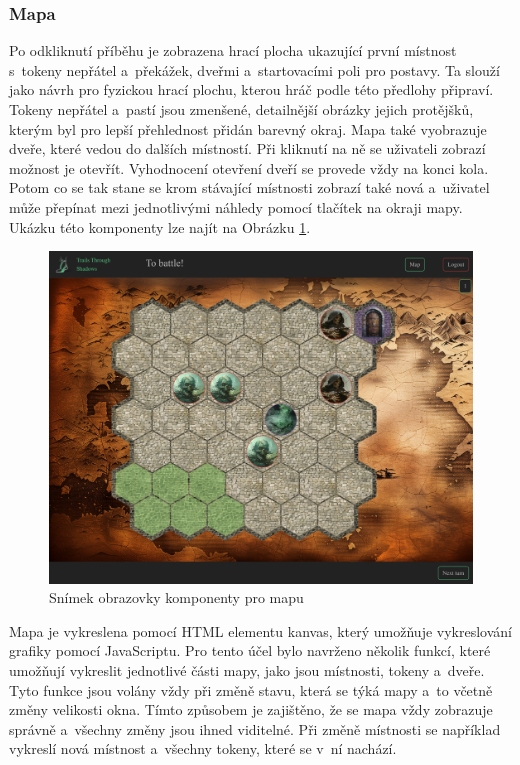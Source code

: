 \subsubsection*{Mapa}
Po odkliknutí příběhu je zobrazena hrací plocha ukazující první místnost s~tokeny nepřátel a~překážek, dveřmi a~startovacími poli pro postavy. Ta slouží jako návrh pro fyzickou hrací plochu, kterou hráč podle této předlohy připraví. Tokeny nepřátel a~pastí jsou zmenšené, detailnější obrázky jejich protějšků, kterým byl pro lepší přehlednost přidán barevný okraj. Mapa také vyobrazuje dveře, které vedou do dalších místností. Při kliknutí na ně se uživateli zobrazí možnost je otevřít. Vyhodnocení otevření dveří se provede vždy na konci kola. Potom co se tak stane se krom stávající místnosti zobrazí také nová a~uživatel může přepínat mezi jednotlivými náhledy pomocí tlačítek na okraji mapy. Ukázku této komponenty lze najít na Obrázku \ref{fig:map}.

\begin{figure}[H]
  \centering
  \includegraphics[width=.95\textwidth]{resources/figures/TTS-Map.png}
  \caption{Snímek obrazovky komponenty pro mapu}
  \label{fig:map}
\end{figure}

Mapa je vykreslena pomocí HTML elementu kanvas, který umožňuje vykreslování grafiky pomocí JavaScriptu. Pro tento účel bylo navrženo několik funkcí, které umožňují vykreslit jednotlivé části mapy, jako jsou místnosti, tokeny a~dveře. Tyto funkce jsou volány vždy při změně stavu, která se týká mapy a~to včetně změny velikosti okna. Tímto způsobem je zajištěno, že se mapa vždy zobrazuje správně a~všechny změny jsou ihned viditelné. Při změně místnosti se například vykreslí nová místnost a~všechny tokeny, které se v~ní nachází. 

